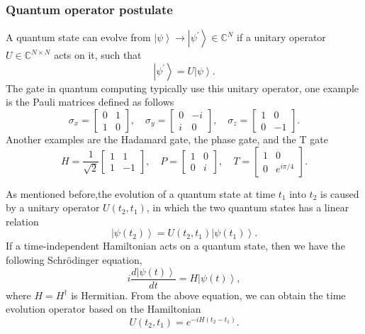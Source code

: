 \documentclass[11pt]{article}
\newcommand{\ket}[1]{\left|#1\right\rangle}
\begin{document}
\subsubsection{Quantum operator postulate}
A quantum state can evolve from $\ket{\psi} \rightarrow \ket{\psi^{'}} \in \mathbb{C}^N$ if a unitary operator $U \in \mathbb{C}^{N\times N}$ acts on it, such that
\begin{equation}
    \ket{\psi^{'}} = U\ket{\psi}.   
\end{equation}
The gate in quantum computing typically use this unitary operator, one example is the Pauli matrices defined as follows
\begin{equation}
    \sigma_x = \begin{bmatrix}
        0 & 1 \\
        1 & 0
    \end{bmatrix}, \quad \sigma_y = \begin{bmatrix}
        0 & -i \\
        i & 0
    \end{bmatrix}, \quad \sigma_z = \begin{bmatrix}
        1 & 0 \\
        0 & -1
    \end{bmatrix}.
\end{equation}
Another examples are the Hadamard gate, the phase gate, and the T gate
\begin{equation}
    H = \frac{1}{\sqrt{2}}\begin{bmatrix}
        1 & 1 \\
        1 & -1
    \end{bmatrix}, \quad P = \begin{bmatrix}
        1 & 0 \\
        0 & i
    \end{bmatrix}, \quad T = \begin{bmatrix}
        1 & 0 \\
        0 & e^{i\pi/4}
    \end{bmatrix}.
\end{equation}

As mentioned before,the evolution of a quantum state at time $t_1$ into $t_2$ is caused by a unitary operator $U(t_2, t_1)$, in which the two quantum states has a linear relation
\begin{equation}
    \ket{\psi(t_2)} = U(t_2, t_1)\ket{\psi(t_1)}.
\end{equation}
If a time-independent Hamiltonian acts on a quantum state, then we have the following Schr\"{o}dinger equation,
\begin{equation}
    i\frac{d\ket{\psi(t)}}{dt} = H\ket{\psi(t)},
\end{equation}
where $H = H^\dagger$ is Hermitian. From the above equation, we can obtain the time evolution operator based on the Hamiltonian
\begin{equation}
    U(t_2, t_1) = e^{-iH(t_2 - t_1)}.
\end{equation}
\end{document}
